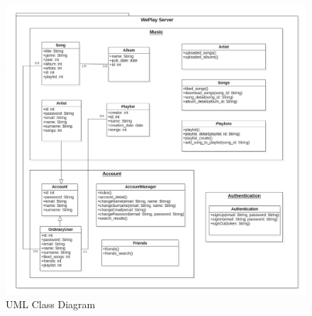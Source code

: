 \begin{figure}[H]
    \centering
    \includegraphics[scale=0.37]{images/ClassDiagram_ver2.jpg}
    \caption{UML Class Diagram}
    \label{fig-uml-class-diag}
\end{figure}
\newpage
